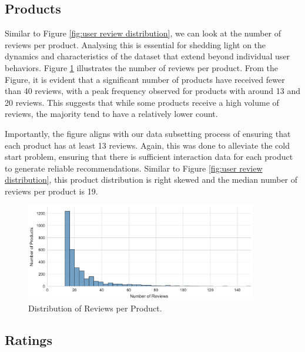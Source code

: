 \subsection{Products}
\label{subsec:3 Products}

Similar to Figure \ref{fig:user review distribution}, we can look at the number of reviews per product. Analysing this is essential for shedding light on the dynamics and characteristics of the dataset that extend beyond individual user behaviors. Figure \ref{fig:product review distribution} illustrates the number of reviews per product. From the Figure, it is evident that a significant number of products have received fewer than 40 reviews, with a peak frequency observed for products with around 13 and 20 reviews. This suggests that while some products receive a high volume of reviews, the majority tend to have a relatively lower count.

Importantly, the figure aligns with our data subsetting process of ensuring that each product has at least 13 reviews. Again, this was done to alleviate the cold start problem, ensuring that there is sufficient interaction data for each product to generate reliable recommendations. Similar to Figure \ref{fig:user review distribution}, this product distribution is right skewed and the median number of reviews per product is 19. 

\begin{figure}[h]
  \centering
  \includegraphics[width=0.9\textwidth]{Figures/reviews_per_product_distribution.pdf} %
  \caption{Distribution of Reviews per Product.}
  \label{fig:product review distribution}
\end{figure}


\subsection{Ratings}
\label{subsec:3 Ratings}


